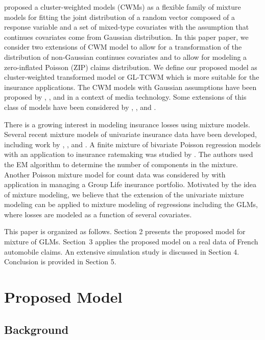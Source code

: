 \documentclass[11pt,letterpaper]{article}
\numberwithin{equation}{section}
\numberwithin{equation}{section}
\numberwithin{equation}{section}
\begin{document}
\cite{Ingrassia+Punzo+Vittadini+Minotti:2015} proposed a cluster-weighted models (CWMs) as a flexible family of mixture models for fitting the joint distribution of a random vector composed of a response variable and a set of mixed-type covariates with the assumption that continues covariates come from Gaussian distribution. In this paper paper, we consider two extensions of CWM model to allow for a transformation of the distribution of non-Gaussian continues covariates and to allow for modeling a zero-inflated Poisson (ZIP) claims distribution. We define our proposed model as cluster-weighted transformed model or GL-TCWM which is more suitable for the insurance applications.
%
The CWM models with Gaussian assumptions have been proposed by \cite{Gershenfeld:1997}, \cite{Gershenfeld:Schoner+Metois:1999}, and \cite{Gershenfeld:1999} in a context of media technology. Some extensions of this class of models have been considered by \cite{Punzo+Ingrassia:2015}, \cite{Ingrassia+Minotti+Punzo:2014}, and \cite{Ingrassia+Minotti+Vittadini:2012}.

There is a growing interest in modeling insurance losses using mixture models. Several recent mixture models of univariate insurance data have been developed, including work by \cite{Lee+Lin:2010}, \cite{Verbelen+Gong+Antonio+Badescu+Lin:2015}, and \cite{Miljkovic+Grun:2016}. A finite mixture of bivariate Poisson regression models with an application to insurance ratemaking was studied by \cite{Bermudez+Karlis:2012}. The authors used the EM algorithm to determine the number of components in the mixture. Another Poisson mixture model for count data was considered by \cite{Brown+Buckley:2015} with application in managing a Group Life insurance portfolio. Motivated by the idea of mixture modeling, we believe that the extension of the univariate mixture modeling can be applied to mixture modeling of regressions including the GLMs, where losses are modeled as a function of several covariates.

This paper is organized as follows. Section 2 presents the proposed model for mixture of GLMs. Section~3 applies the proposed model on a real data of French automobile claims. An extensive simulation study is discussed in Section 4. Conclusion is provided in Section 5.


\section{Proposed Model}

\subsection{Background}
\end{document}
